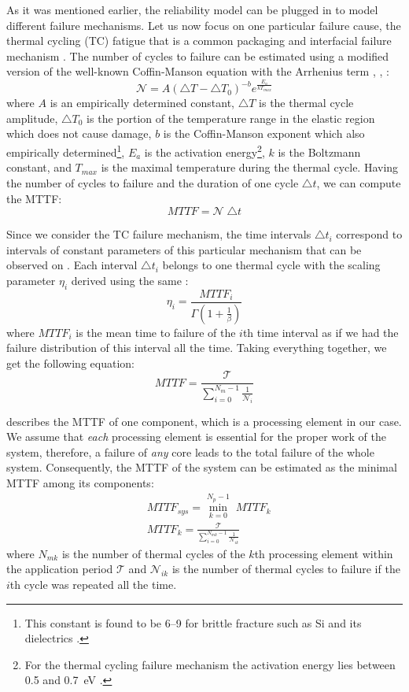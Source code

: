 As it was mentioned earlier, the reliability model can be plugged in to model different failure mechanisms. Let us now focus on one particular failure cause, the thermal cycling (TC) fatigue that is a common packaging and interfacial failure mechanism \cite{jedec2010}. The number of cycles to failure can be estimated using a modified version of the well-known Coffin-Manson equation with the Arrhenius term \cite{jedec2010}, \cite{xiang2010}, \cite{ciappa2003}:
\begin{equation} \label{eq:cycles-to-failure}
  \mathcal{N} = A (\triangle T - \triangle T_0)^{-b} e^{\frac{E_a}{k T_{max}}}
\end{equation}
where $A$ is an empirically determined constant, $\triangle T$ is the thermal cycle amplitude, $\triangle T_0$ is the portion of the temperature range in the elastic region which does not cause damage, $b$ is the Coffin-Manson exponent which also empirically determined\footnote{This constant is found to be 6--9 for brittle fracture such as Si and its dielectrics \cite{jedec2010}.}, $E_{a}$ is the activation energy\footnote{For the thermal cycling failure mechanism the activation energy lies between 0.5 and 0.7~eV \cite{vigrass}.}, $k$ is the Boltzmann constant, and $T_{max}$ is the maximal temperature during the thermal cycle. Having the number of cycles to failure and the duration of one cycle $\triangle t$, we can compute the MTTF:
\[
  MTTF = \mathcal{N} \; \triangle t
\]

Since we consider the TC failure mechanism, the time intervals $\triangle t_i$ correspond to intervals of constant parameters of this particular mechanism that can be observed on . Each interval $\triangle t_i$ belongs to one thermal cycle with the scaling parameter $\eta_i$ derived using the same :
\[
  \eta_i = \frac{MTTF_i}{\Gamma(1 + \frac{1}{\beta})}
\]
where $MTTF_i$ is the mean time to failure of the $i$th time interval as if we had the failure distribution of this interval all the time. Taking everything together, we get the following equation:
\begin{equation} \label{eq:one-mttf}
  MTTF = \frac{\mathcal{T}}{\sum_{i=0}^{N_m - 1} \frac{1}{\mathcal{N}_i}}
\end{equation}

 describes the MTTF of one component, which is a processing element in our case. We assume that \emph{each} processing element is essential for the proper work of the system, therefore, a failure of \emph{any} core leads to the total failure of the whole system. Consequently, the MTTF of the system can be estimated as the minimal MTTF among its components:
\begin{align*}
  & MTTF_{sys} = \min_{k=0}^{N_p - 1} \; MTTF_k \\
  & MTTF_k = \frac{\mathcal{T}}{\sum_{i=0}^{N_{mk} - 1} \frac{1}{\mathcal{N}_{ik}}}
\end{align*}
where $N_{mk}$ is the number of thermal cycles of the $k$th processing element within the application period $\mathcal{T}$ and $\mathcal{N}_{ik}$ is the number of thermal cycles to failure if the $i$th cycle was repeated all the time.


